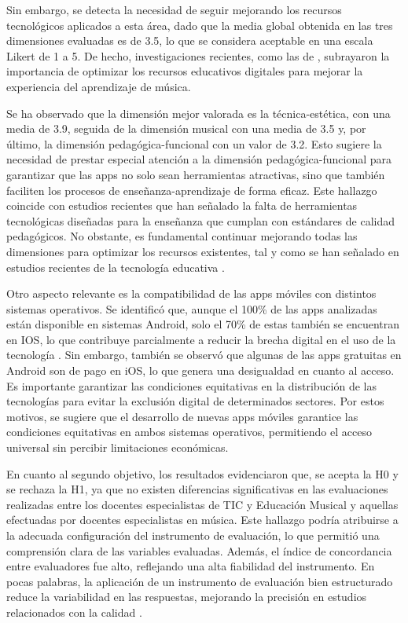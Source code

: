 \documentclass[spanish]{textolivre}
\begin{document}
Sin embargo, se detecta la necesidad de seguir mejorando los recursos tecnológicos aplicados a esta área, dado que la media global obtenida en las tres dimensiones evaluadas es de 3.5, lo que se considera aceptable en una escala Likert de 1 a 5. De hecho, investigaciones recientes, como las de \textcite{rajput2023}, subrayaron la importancia de optimizar los recursos educativos digitales para mejorar la experiencia del aprendizaje de música. 

Se ha observado que la dimensión mejor valorada es la técnica-estética, con una media de 3.9, seguida de la dimensión musical con una media de 3.5 y, por último, la dimensión pedagógica-funcional con un valor de 3.2. Esto sugiere la necesidad de prestar especial atención a la dimensión pedagógica-funcional para garantizar que las apps no solo sean herramientas atractivas, sino que también faciliten los procesos de enseñanza-aprendizaje de forma eficaz. Este hallazgo coincide con estudios recientes que han señalado la falta de herramientas tecnológicas diseñadas para la enseñanza que cumplan con estándares de calidad pedagógicos. No obstante, es fundamental continuar mejorando todas las dimensiones para optimizar los recursos existentes, tal y como se han señalado en estudios recientes de la tecnología educativa \cite{barroso-osuna2024, leon-garrido2025b}.

Otro aspecto relevante es la compatibilidad de las apps móviles con distintos sistemas operativos. Se identificó que, aunque el 100\% de las apps analizadas están disponible en sistemas Android, solo el 70\% de estas también se encuentran en IOS, lo que contribuye parcialmente a reducir la brecha digital en el uso de la tecnología \cite{rajput2023}. Sin embargo, también se observó que algunas de las apps gratuitas en Android son de pago en iOS, lo que genera una desigualdad en cuanto al acceso. Es importante garantizar las condiciones equitativas en la distribución de las tecnologías para evitar la exclusión digital de determinados sectores. Por estos motivos, se sugiere que el desarrollo de nuevas apps móviles garantice las condiciones equitativas en ambos sistemas operativos, permitiendo el acceso universal sin percibir limitaciones económicas.

En cuanto al segundo objetivo, los resultados evidenciaron que, se acepta la H0 y se rechaza la H1, ya que no existen diferencias significativas en las evaluaciones realizadas entre los docentes especialistas de TIC y Educación Musical y aquellas efectuadas por docentes especialistas en música. Este hallazgo podría atribuirse a la adecuada configuración del instrumento de evaluación, lo que permitió una comprensión clara de las variables evaluadas. Además, el índice de concordancia entre evaluadores fue alto, reflejando una alta fiabilidad del instrumento. En pocas palabras, la aplicación de un instrumento de evaluación bien estructurado reduce la variabilidad en las respuestas, mejorando la precisión en estudios relacionados con la calidad \cite{meneses-rodriguez2024}.
\end{document}
